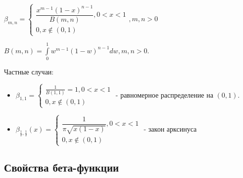 \begin{definition}
  $\beta_{m, n} = \begin{cases}
    \dfrac{x^{m-1}  (1-x)^{n-1}}{B(m, n)}, 0 < x < 1 \\
    0, x \notin (0, 1)
  \end{cases}, m, n > 0$
\end{definition}

\begin{definition}
  $B(m, n) = \int\limits_0^1 w^{m-1} (1-w)^{n-1} dw, m, n>0$.
\end{definition}

\begin{remark}
  Частные случаи:
  \begin{itemize}
    \item $\beta_{1, 1} = \begin{cases}
        \frac{1}{B(1, 1)} = 1, 0<x<1 \\
        0, x\notin (0, 1)
      \end{cases}$ - равномерное распределение на $(0, 1)$.

    \item $\beta_{\frac{1}{2}, \frac{1}{2}} (x) = \begin{cases}
        \dfrac{1}{\pi \sqrt{x(1-x)}}, 0<x<1 \\
        0, x \notin (0, 1)
      \end{cases}$ - закон арксинуса
  \end{itemize}
\end{remark}

\subsection{Свойства бета-функции}

